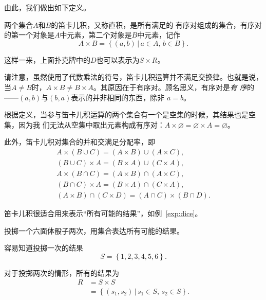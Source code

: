 由此，我们做出如下定义。

\begin{rawdef}[笛卡儿积]
    两个集合$A$和$B$的笛卡儿积，又称直积，是所有满足的
    有序对组成的集合，有序对的第一个对象是$A$中元素，第二个对象是$B$中元素，记作
    \[
        A \times B = \left\{ \left( a,b \right) \,|\, a\in A,\, b\in B \right\}.
    \]
\end{rawdef}

这样一来，上面扑克牌中的$D$也可以表示为$S\times R$。

请注意，虽然使用了代数乘法的符号，笛卡儿积运算并不满足交换律。也就是说，当$A\neq
B$时，$A \times B \neq B \times A$。其原因在于有序对。顾名思义，有序对是\emph{有
序}的——$\left( a,b \right)$与$\left( b,a \right) $表示的并非相同的东西，除非
$a=b$。

根据定义，当参与笛卡儿积运算的两个集合有一个是空集的时候，其结果也是空集，因为我
们无法从空集中取出元素构成有序对：$A \times \varnothing = \varnothing \times A = 
\varnothing$。

此外，笛卡儿积对集合的并和交满足分配率，即
\begin{align*}
    A\times (B\cup C)=(A\times B)\cup (A\times C),\\
    (B\cup C)\times A=(B\times A)\cup (C\times A),\\
    A\times (B\cap C)=(A\times B)\cap (A\times C),\\
    (B\cap C)\times A=(B\times A)\cap (C\times A),\\
    (A\times B)\cap (C\times D)=(A\cap C)\times (B\cap D).
\end{align*}


笛卡儿积很适合用来表示“所有可能的结果”，如例~\ref{exp:dice}。

\begin{rawexp}\label{exp:dice}
    投掷一个六面体骰子两次，用集合表达所有可能的结果。
\end{rawexp}

\begin{rawsol}
    容易知道投掷一次的结果
    \[
        S = \left\{ 1,2,3,4,5,6 \right\}.
    \]

    对于投掷两次的情形，所有的结果为
    \begin{align*}
        R &= S \times S\\
          &= \left\{ \left( s_{1},s_{2} \right) \,|\, s_{1}\in S,\,s_{2}\in S \right\} .
    \end{align*}
\end{rawsol}

